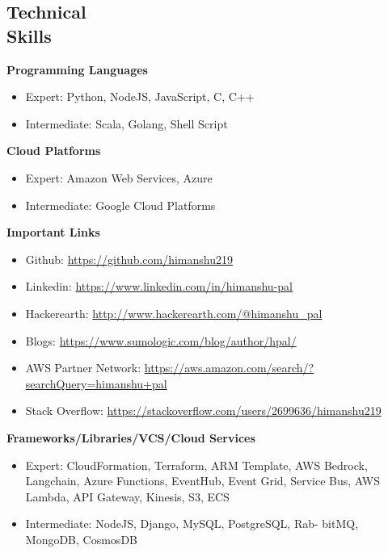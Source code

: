 \documentclass[margin,line]{resume}
\begin{document}
\begin{resume}
    \section{\mysidestyle Technical \\ Skills}
    \vspace{0mm}
     \textbf{Programming Languages}
     \begin{itemize}
          \item Expert: Python, NodeJS, JavaScript, C, C++
          \item Intermediate: Scala, Golang, Shell Script
     \end{itemize}
     \textbf{Cloud Platforms}
     \begin{itemize}
          \item Expert: Amazon Web Services, Azure
          \item Intermediate: Google Cloud Platforms
     \end{itemize}
     \textbf{Important Links}
     \begin{itemize}
          \item Github: \url{https://github.com/himanshu219}
          \item Linkedin: \url{https://www.linkedin.com/in/himanshu-pal}
          \item Hackerearth: \url{http://www.hackerearth.com/@himanshu_pal}
          \item Blogs: \url{https://www.sumologic.com/blog/author/hpal/}
          \item AWS Partner Network: \url{https://aws.amazon.com/search/?searchQuery=himanshu+pal}
          \item Stack Overflow: \url{https://stackoverflow.com/users/2699636/himanshu219}
     \end{itemize}
      \textbf{Frameworks/Libraries/VCS/Cloud Services} 
      \begin{itemize}
          \item Expert: CloudFormation, Terraform, ARM Template, AWS Bedrock, Langchain, Azure Functions, EventHub, Event Grid, Service Bus, AWS Lambda, API Gateway, Kinesis, S3, ECS
          \item Intermediate: NodeJS, Django, MySQL, PostgreSQL, Rab-
bitMQ, MongoDB, CosmosDB
     \end{itemize}

\end{resume}
\end{document}
